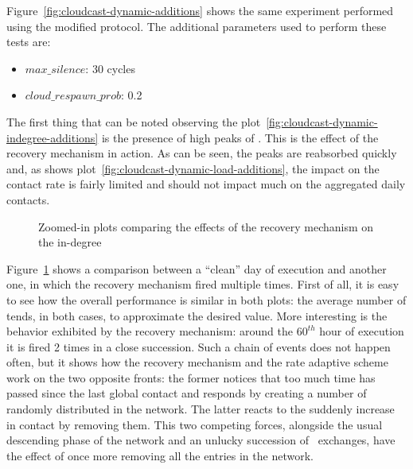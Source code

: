 Figure~\ref{fig:cloudcast-dynamic-additions} shows the same experiment
performed using the modified \cloudcast protocol. The additional
parameters used to perform these tests are:
\begin{itemize}
  \item $max\_silence$: 30 cycles
  \item $cloud\_respawn\_prob$: 0.2
\end{itemize}

The first thing that can be noted observing the
plot~\ref{fig:cloudcast-dynamic-indegree-additions} is the presence of
high peaks of \cloud \descriptors. This is the effect of the recovery
mechanism in action. As can be seen, the peaks are reabsorbed quickly
and, as shows plot~\ref{fig:cloudcast-dynamic-load-additions}, the
impact on the \cloud contact rate is fairly limited and should not
impact much on the aggregated daily contacts.

\begin{figure}[h!]
  \centering
  \caption{Zoomed-in plots comparing the effects of the recovery
    mechanism on the \cloud in-degree}
  \label{fig:cloudcast-dynamic-indegree-additions-detail}
\end{figure}


Figure~\ref{fig:cloudcast-dynamic-indegree-additions-detail} shows a
comparison between a ``clean'' day of execution and another one, in which the
recovery mechanism fired multiple times. First of all, it is easy to see
how the overall performance is similar in both plots: the average
number of \cloud \descriptors tends, in both cases, to approximate the
desired value.
More interesting is the behavior exhibited by the recovery mechanism:
around the $60^{th}$ hour of execution it is fired 2 times in a close
succession. Such a chain of events does not happen often, but it shows
how the recovery mechanism and the \cloud rate adaptive scheme work
on the two opposite fronts: the former notices that too much time has
passed since the last global \cloud contact and responds by creating a
number of \cloud \descriptors randomly distributed in the network. The
latter reacts to the suddenly increase in contact by removing
them.
This two competing forces, alongside the usual descending phase of the
network and an unlucky succession of \view\ exchanges, have the effect
of once more removing all the \cloud entries in the network.


